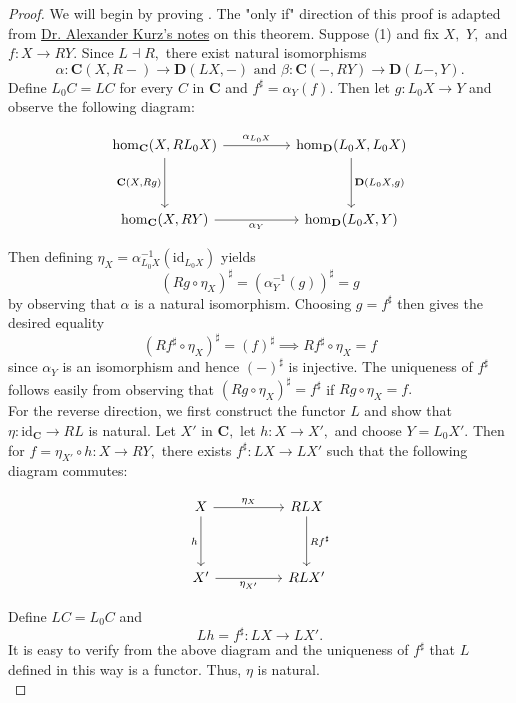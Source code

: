 \documentclass{article}
\numberwithin{equation}{section}
\newcommand{\cat}[1]{{\mathbf{#1}}}
\newcommand{\id}{\mathrm{id}}
\begin{document}
\begin{proof}
We will begin by proving . The "only if" direction of this proof is adapted from \href{https://hackmd.io/@alexhkurz/HyT3zuR8h}{Dr. Alexander Kurz's notes} on this theorem. Suppose (1) and fix $X,$ $Y,$ and $f : X \to RY.$ Since $L \dashv R,$ there exist natural isomorphisms $$\alpha: \cat{C}(X, R-) \to \cat{D}(LX, -) \text{ and } \beta : \cat{C}(-, RY) \to \cat{D}(L-, Y).$$ Define $L_0C = LC$ for every $C$ in $\cat C$ and $f^\sharp = \alpha_Y(f).$ Then let $g : L_0X \to Y$ and observe the following diagram:

\[\begin{tikzcd}
	{\hom_\textbf C(X, RL_0X)} && {\hom_\textbf D (L_0X, L_0X)} \\
	\\
	{\hom_\textbf C(X, RY)} && {\hom_\textbf D (L_0X, Y)}
	\arrow["{\alpha_Y}"', from=3-1, to=3-3]
	\arrow["{\alpha_{L_0X}}", from=1-1, to=1-3]
	\arrow["{\textbf C(X, Rg)}"', from=1-1, to=3-1]
	\arrow["{\textbf D(L_0X, g)}", from=1-3, to=3-3]
\end{tikzcd}\]

Then defining $\eta_X = \alpha_{L_0X}^{-1}(\id_{L_0X})$ yields $$(Rg \circ \eta_X)^\sharp = (\alpha_Y^{-1}(g))^\sharp = g$$ by observing that $\alpha$ is a natural isomorphism. Choosing $g = f^\sharp$ then gives the desired equality $$(Rf^\sharp \circ \eta_X)^\sharp = (f)^\sharp \implies Rf^\sharp \circ \eta_X = f$$ since $\alpha_Y$ is an isomorphism and hence $(-)^\sharp$ is injective. The uniqueness of $f^\sharp$ follows easily from observing that $(Rg \circ \eta_X)^\sharp = f^\sharp$ if $Rg \circ \eta_X = f.$ \\

For the reverse direction, we first construct the functor $L$ and show that $\eta : \id_{\cat C} \to RL$ is natural. Let $X'$ in $\cat C,$ let $h : X \to X',$ and choose $Y = L_0X'.$ Then for $f = \eta_{X'} \circ h : X \to RY,$ there exists $f^\sharp : LX \to LX'$ such that the following diagram commutes:

\[\begin{tikzcd}
	X && RLX \\
	\\
	{X'} && {RLX'}
	\arrow["{\eta_{X'}}"', from=3-1, to=3-3]
	\arrow["{Rf^\sharp}", from=1-3, to=3-3]
	\arrow["h"', from=1-1, to=3-1]
	\arrow["{\eta_X}", from=1-1, to=1-3]
\end{tikzcd}\]

Define $LC = L_0C$ and $$Lh = f^\sharp : LX \to LX'.$$ It is easy to verify from the above diagram and the uniqueness of $f^\sharp$ that $L$ defined in this way is a functor. Thus, $\eta$ is natural. \\


\end{proof}
\end{document}
